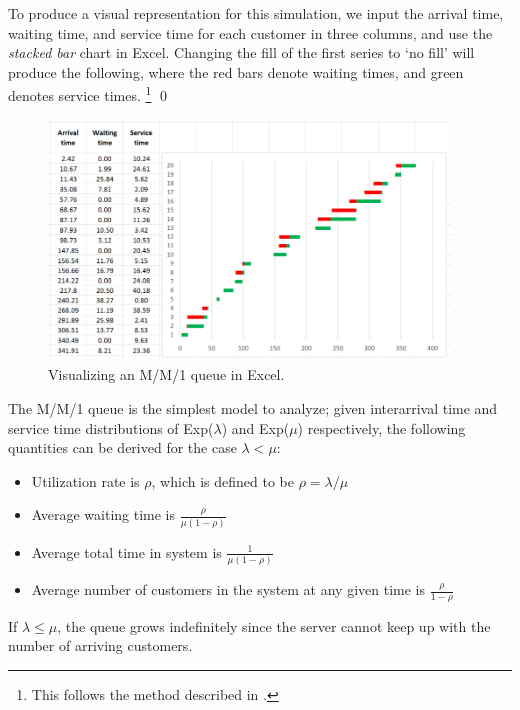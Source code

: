 \begin{myexample}
To produce a visual representation for this simulation, we input the arrival time, waiting time, and service time for each customer in three columns, and use the \emph{stacked bar} chart in Excel.
Changing the fill of the first series to `no fill' will produce the following, where the red bars denote waiting times, and green denotes service times.
\footnote{This follows the method described in \cite{ig2002}.} \qed


\begin{figure}[htbp]
	\centering
	\includegraphics[width=0.95\textwidth]{fig/4_queue1chart.png}
	\caption{Visualizing an M/M/1 queue in Excel. \label{fig:4_queue1chart}}
\end{figure}

\end{myexample}

The M/M/1 queue is the simplest model to analyze; given interarrival time and service time distributions of Exp($\lambda$) and Exp($\mu$) respectively, the following quantities can be derived for the case $\lambda < \mu$:

\begin{itemize}
	\item Utilization rate is $\rho$, which is defined to be $\rho = \lambda/\mu$
	\item Average waiting time is $\frac{\rho}{\mu(1-\rho)}$
	\item Average total time in system is $\frac{1}{\mu(1 - \rho)}$
	\item Average number of customers in the system at any given time is $\frac{\rho}{1-\rho}$
\end{itemize}

If $\lambda \leq \mu$, the queue grows indefinitely since the server cannot keep up with the number of arriving customers.

